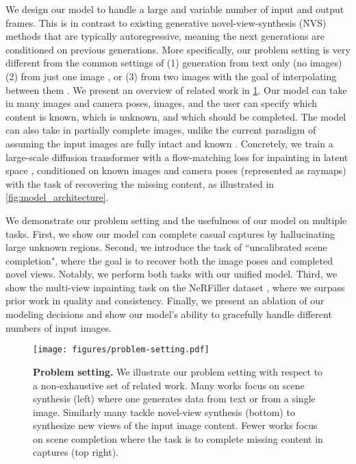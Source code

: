 We design our model to handle a large and variable number of input and output frames.
This is in contrast to existing generative novel-view-synthesis (NVS) methods that are typically autoregressive, meaning the next generations are conditioned on previous generations.
More specifically, our problem setting is very different from the common settings of
(1) generation from text only (no images) \cite{HoelleCOJN2023,WangLWBLSZ2023,ShiWYLLY2024}
(2) from just one image \cite{liu2023zero,SargeLSHYZCLFSW2024}, or
(3) from two images with the goal of interpolating between them \cite{jin2024lvsm,yu2024viewcrafter}.
We present an overview of related work in \cref{fig:problem_setting}.
Our model can take in many images and camera poses,  images, and the user can specify which content is known, which is unknown, and which should be completed.
The model can also take in partially complete images, unlike the current paradigm of assuming the input images are fully intact and known \cite{liu2023zero,gao2024cat3d}.
Concretely, we train a large-scale diffusion transformer with a flow-matching loss for inpainting in latent space \cite{rombach2022high}, conditioned on known images and camera poses (represented as raymaps) with the task of recovering the missing content, as illustrated in \cref{fig:model_architecture}.

We demonstrate our problem setting and the usefulness of our \method model on multiple tasks.
First, we show our model can complete casual captures by hallucinating large unknown regions.
Second, we introduce the task of ``uncalibrated scene completion", where the goal is to recover both the image poses and completed novel views.
Notably, we perform both tasks with our unified model.
Third, we show the multi-view inpainting task on the NeRFiller dataset \cite{weber2024nerfiller}, where we surpass prior work in quality and consistency.
Finally, we present an ablation of our modeling decisions and show our model's ability to gracefully handle different numbers of input images.

\begin{figure}[t]
\centering
\texttt{[image: figures/problem-setting.pdf]}
\caption{\label{fig:problem_setting}%
    \textbf{Problem setting.}
    We illustrate our problem setting with respect to a non-exhaustive set of related work.
    Many works focus on scene synthesis (left) where one generates data from text or from a single image.
    Similarly many tackle novel-view synthesis (bottom) to synthesize new views of the input image content.
    Fewer works focus on scene completion where the task is to complete missing content in captures (top right).
}
\end{figure}


